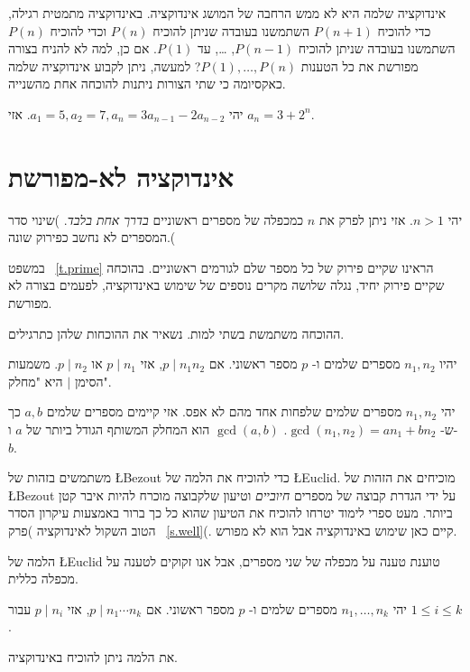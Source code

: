 אינדוקציה שלמה היא לא ממש הרחבה של המושג אינדוקציה. באינדוקציה מתמטית רגילה, כדי להוכיח
$P(n+1)$
השתמשנו בעובדה שניתן להוכיח
$P(n)$
וכדי להוכיח
$P(n)$
השתמשנו בעובדה שניתן להוכיח
$P(n-1)$, \ldots,
עד
$P(1)$.
אם כן, למה לא להניח בצורה מפורשת את כל הטענות
$P(1),\ldots,P(n)$?
למעשה, ניתן לקבוע אינדוקציה שלמה כאקסיומה כי שתי הצורות ניתנות להוכחה אחת מהשנייה.

\begin{exercise}
יהי
$a_1=5, a_2=7, a_n=3a_{n-1} - 2a_{n-2}$.
אזי
$a_n=3+2^n$.
\end{exercise}

\section{%
אינדוקציה לא-מפורשת%
}\label{s.unique}

\begin{theorem}
יהי
$n>1$.
אזי ניתן לפרק את
$n$
כמכפלה של מספרים ראשוניים
\emph{בדרך אחת בלבד}.
)שינוי סדר המספרים לא נחשב כפירוק שונה.(
\end{theorem}

במשפט~%
\ref{t.prime}
הראינו שקיים פירוק של כל מספר שלם לגורמים ראשוניים. בהוכחה שקיים פירוק יחיד, נגלה שלושה מקרים נוספים של שימוש באינדוקציה, לפעמים בצורה לא מפורשת.

ההוכחה משתמשת בשתי למות. נשאיר את ההוכחות שלהן כתרגילים.

\begin{lemma}
יהיו
$n_1,n_2$
מספרים שלמים
ו-%
$p$
מספר ראשוני. אם
$p \mid n_1 n_2$,
אזי
$p\mid n_1$ 
או
$p\mid n_2$.
משמעות הסימן
$|$
היא "מחלק".
\end{lemma}

\begin{lemma}
יהי
$n_1, n_2$
מספרים שלמים שלפחות אחד מהם לא אפס. אזי קיימים מספרים שלמים
$a,b$
כך ש-%
$\gcd(n_1,n_2)=an_1+bn_2$. $\gcd(a,b)$
הוא המחלק המשותף הגודל ביותר של
$a$
ו-%
$b$.
\end{lemma}

משתמשים בזהות של
\L{Bezout}
כדי להוכיח את הלמה של
\L{Euclid}.
מוכיחים את הזהות של
\L{Bezout}
על ידי הגדרת קבוצה של מספרים
\emph{חיוביים}
וטיעון שלקבוצה מוכרח להיות איבר קטן ביותר. מעט ספרי לימוד יטרחו להוכיח את הטיעון שהוא כל כך ברור באמצעות עיקרון הסדר הטוב השקול לאינדוקציה )פרק~%
\ref{s.well}(.
קיים כאן שימוש באינדוקציה אבל הוא לא מפורש.

הלמה של
\L{Euclid}
טוענת טענה על מכפלה של שני מספרים, אבל אנו זקוקים לטענה על מכפלה כללית.
\begin{lemma}
יהי
$n_1,\ldots,n_k$
מספרים שלמים ו-%
$p$
מספר ראשוני. אם
$p \mid n_1 \cdots n_k$,
אזי
$p\mid n_i$
עבור
$1\leq i \leq k$.
\end{lemma}
את הלמה ניתן להוכיח באינדוקציה.

